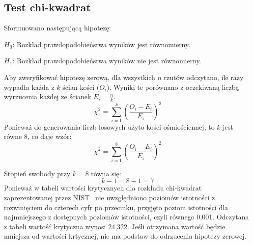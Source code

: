\subsection{Test chi-kwadrat}
Sformuowano następującą hipotezę:
\par \begin{math} H_0 \end{math}: Rozkład prawdopodobieństwa wyników jest równomierny.
\par \begin{math} H_1 \end{math}: Rozkład prawdopodobieństwa wyników nie jest równomierny.
\par Aby zweryfikować hipotezę zerową, dla wszystkich \begin{math} n \end{math} rzutów odczytano, ile razy wypadła każda z 
\begin{math} k \end{math} ścian kości (\begin{math}O_i\end{math}). Wyniki te porównano z oczekiwaną
liczbą wyrzucenia każdej ze ścianek \begin{math}E_i = \frac{n}{k}\end{math}. 
\begin{displaymath}
    \chi^2 = \sum_{i=1}^{k} \left( \frac{O_i - E_i}{E_i} \right)^2
\end{displaymath}
Ponieważ do generowania liczb losowych użyto kości ośmiościennej, to \begin{math} k \end{math} jest równe 8, co daje wzór:
\begin{displaymath}
    \chi^2 = \sum^{8}_{i=1} \left( \frac{O_i - E_i}{E_i} \right)^2
\end{displaymath}
\par Stopień swobody przy \begin{math} k = 8 \end{math} równa się:
\begin{displaymath}
    k - 1 = 8 - 1 = 7
\end{displaymath}
Ponieważ w tabeli wartości krytycznych dla rozkładu chi-kwadrat zaprezentowanej przez NIST~\cite{NIST2012} nie
uwzględniono poziomów istotności z rozwinięciem do czterech cyfr po przecinku, przyjęto poziom istotności dla 
najmniejszego z dostępnych poziomów istotności, czyli równego 0{,}001. Odczytana z tabeli wartość krytyczna wynosi
24{,}322. Jeśli otrzymana wartość będzie mniejsza od wartości krtycznej, nie ma podstaw do odrzucenia 
hipotezy zerowej.


